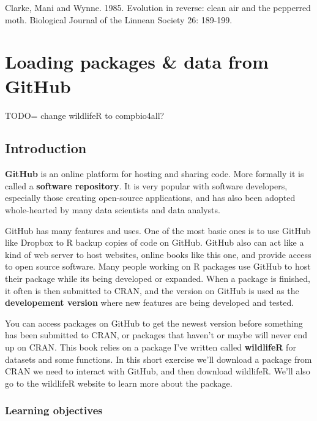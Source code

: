 \documentclass[
]{book}
\begin{document}
Clarke, Mani and Wynne. 1985. Evolution in reverse: clean air and the pepperred moth.
Biological Journal of the Linnean Society 26: 189-199.

\hypertarget{loading-packages-data-from-github}{%
\chapter{Loading packages \& data from GitHub}\label{loading-packages-data-from-github}}

TODO= change wildlifeR to compbio4all?

\hypertarget{introduction}{%
\section{Introduction}\label{introduction}}

\textbf{GitHub} is an online platform for hosting and sharing code. More formally it is called a \textbf{software repository}. It is very popular with software developers, especially those creating open-source applications, and has also been adopted whole-hearted by many data scientists and data analysts.

GitHub has many features and uses. One of the most basic ones is to use GitHub like Dropbox to R backup copies of code on GitHub. GitHub also can act like a kind of web server to host websites, online books like this one, and provide access to open source software. Many people working on R packages use GitHub to host their package while its being developed or expanded. When a package is finished, it often is then submitted to CRAN, and the version on GitHub is used as the \textbf{developement version} where new features are being developed and tested.

You can access packages on GitHub to get the newest version before something has been submitted to CRAN, or packages that haven't or maybe will never end up on CRAN. This book relies on a package I've written called \textbf{wildlifeR} for datasets and some functions. In this short exercise we'll download a package from CRAN we need to interact with GitHub, and then download wildlifeR. We'll also go to the wildlifeR website to learn more about the package.

\hypertarget{learning-objectives}{%
\subsection{Learning objectives}\label{learning-objectives}}
\end{document}
